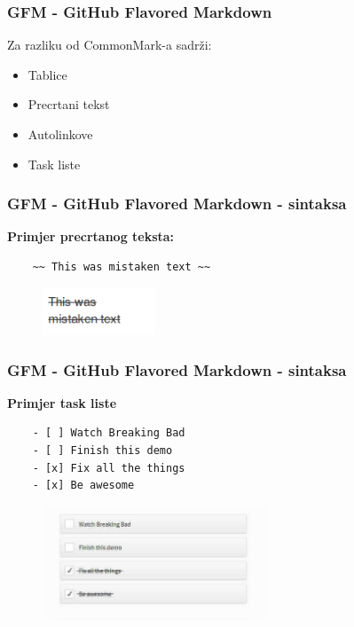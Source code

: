 \documentclass{beamer}
\begin{document}
\begin{frame}
	\frametitle{GFM - GitHub Flavored Markdown}

	Za razliku od CommonMark-a sadrži:
	\begin{itemize}
		\item{Tablice}
		\item{Precrtani tekst}
		\item{Autolinkove}
		\item{Task liste}
	\end{itemize}
\end{frame}

\begin{frame}[fragile]
	\frametitle{GFM - GitHub Flavored Markdown - sintaksa}

	\textbf{Primjer precrtanog teksta:}

	\begin{verbatim}
	~~ This was mistaken text ~~
	\end{verbatim}

	\begin{figure}[htbp]
	\includegraphics[width=0.3\textwidth]{Slike/kod3.png}
	
	\end{figure}

\end{frame}

\begin{frame}[fragile]
	\frametitle{GFM - GitHub Flavored Markdown - sintaksa}

	\textbf{Primjer task liste}

	\begin{verbatim}
	- [ ] Watch Breaking Bad
	- [ ] Finish this demo
	- [x] Fix all the things
	- [x] Be awesome
	\end{verbatim}

	\begin{figure}[htbp]
	\includegraphics[width=0.6\textwidth]{Slike/kod4.png}
	
	\end{figure}
\end{frame}
\end{document}
